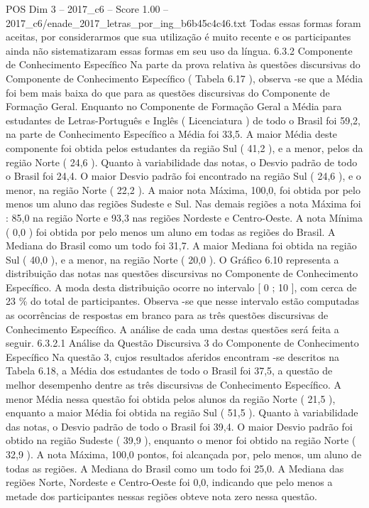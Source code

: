 \begin{textsample}{POS Dim 3 – 2017\_c6 – Score 1.00 – 2017\_c6/enade\_2017\_letras\_por\_ing\_b6b45c4c46.txt}
Todas essas formas foram aceitas, por considerarmos que sua utilização é muito recente e os participantes ainda não sistematizaram essas formas em seu uso da língua. 6.3.2 Componente de Conhecimento Específico Na parte da prova relativa às questões discursivas do Componente de Conhecimento Específico ( Tabela 6.17 ), observa -se que a Média foi bem mais baixa do que para as questões discursivas do Componente de Formação Geral.
Enquanto no Componente de Formação Geral a Média para estudantes de Letras-Português e Inglês ( Licenciatura ) de todo o Brasil foi 59,2, na parte de Conhecimento Específico a Média foi 33,5.
A maior Média deste componente foi obtida pelos estudantes da região Sul ( 41,2 ), e a menor, pelos da região Norte ( 24,6 ).
Quanto à variabilidade das notas, o Desvio padrão de todo o Brasil foi 24,4.
O maior Desvio padrão foi encontrado na região Sul ( 24,6 ), e o menor, na região Norte ( 22,2 ).
A maior nota Máxima, 100,0, foi obtida por pelo menos um aluno das regiões Sudeste e Sul.
Nas demais regiões a nota Máxima foi : 85,0 na região Norte e 93,3 nas regiões Nordeste e Centro-Oeste.
A nota Mínima ( 0,0 ) foi obtida por pelo menos um aluno em todas as regiões do Brasil.
A Mediana do Brasil como um todo foi 31,7.
A maior Mediana foi obtida na região Sul ( 40,0 ), e a menor, na região Norte ( 20,0 ).
O Gráfico 6.10 representa a distribuição das notas nas questões discursivas no Componente de Conhecimento Específico.
A moda desta distribuição ocorre no intervalo [ 0 ; 10 ], com cerca de 23 \% do total de participantes.
Observa -se que nesse intervalo estão computadas as ocorrências de respostas em branco para as três questões discursivas de Conhecimento Específico.
A análise de cada uma destas questões será feita a seguir. 6.3.2.1 Análise da Questão Discursiva 3 do Componente de Conhecimento Específico Na questão 3, cujos resultados aferidos encontram -se descritos na Tabela 6.18, a Média dos estudantes de todo o Brasil foi 37,5, a questão de melhor desempenho dentre as três discursivas de Conhecimento Específico.
A menor Média nessa questão foi obtida pelos alunos da região Norte ( 21,5 ), enquanto a maior Média foi obtida na região Sul ( 51,5 ).
Quanto à variabilidade das notas, o Desvio padrão de todo o Brasil foi 39,4.
O maior Desvio padrão foi obtido na região Sudeste ( 39,9 ), enquanto o menor foi obtido na região Norte ( 32,9 ).
A nota Máxima, 100,0 pontos, foi alcançada por, pelo menos, um aluno de todas as regiões.
A Mediana do Brasil como um todo foi 25,0.
A Mediana das regiões Norte, Nordeste e Centro-Oeste foi 0,0, indicando que pelo menos a metade dos participantes nessas regiões obteve nota zero nessa questão.

\end{textsample}
